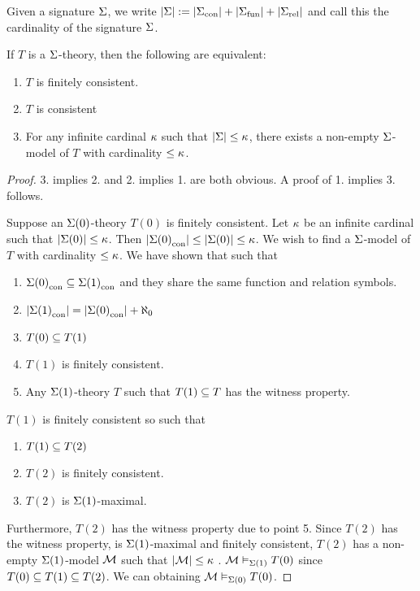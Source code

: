 \begin{nttn}
    Given a signature $\Sigma$, 
    we write
    $|\Sigma| := |{\Sigma}_\mathrm{con}| + |{\Sigma}_\mathrm{fun}| + |{\Sigma}_\mathrm{rel}|$
    and call this the cardinality of the signature $\Sigma$.
\end{nttn}

\begin{prop}
    If $T$ is a $\Sigma$-theory, 
    then the following are equivalent:
    \begin{enumerate}
        \item $T$ is finitely consistent.
        \item $T$ is consistent
        \item For any infinite cardinal $\kappa$ 
        such that $|\Sigma| \leq \kappa$, 
        there exists a non-empty $\Sigma$-model of 
        $T$ with cardinality $\leq \kappa$.
    \end{enumerate}
\end{prop}
\begin{proof}
    3. implies 2. and 2. implies 1. are both obvious. 
    A proof of 1. implies 3. follows.

    Suppose an
    $\Sigma(0)$-theory $T(0)$ is finitely consistent.
    Let $\kappa$ be an infinite cardinal such that 
    $|\Sigma(0)| \leq \kappa$. Then
    $|{\Sigma(0)}_\mathrm{con}| \leq |\Sigma(0)| \leq \kappa$.
    We wish to find a $\Sigma$-model of $T$ with cardinality $\leq \kappa$.
    We have shown that  such that 
    \begin{enumerate}
        \item ${\Sigma(0)}_\mathrm{con} \subseteq {\Sigma(1)}_\mathrm{con}$
        and they share the same function and relation symbols.
        \item $|{\Sigma(1)}_\mathrm{con}| = |{\Sigma(0)}_\mathrm{con}| + \aleph_0$
        \item $T(0) \subseteq T(1)$
        \item $T(1)$ is finitely consistent.
        \item Any $\Sigma(1)$-theory $T$ such that $T(1) \subseteq T$ 
        has the witness property.
    \end{enumerate}
    $T(1)$ is finitely consistent so
     such that 
    \begin{enumerate}[resume]
        \item $T(1) \subseteq T(2)$
        \item $T(2)$ is finitely consistent.
        \item $T(2)$ is $\Sigma(1)$-maximal.
    \end{enumerate}
    Furthermore, $T(2)$ has the witness property due to point 5.
    Since $T(2)$ has the witness property, is $\Sigma(1)$-maximal
    and finitely consistent,
    $T(2)$ has a non-empty $\Sigma(1)$-model $\mathcal{M}$ such that $|\mathcal{M}| \leq \kappa$
    .
    $\mathcal{M} \vDash_{\Sigma(1)} T(0)$ since $T(0) \subseteq T(1) \subseteq T(2)$.
    We can 
    obtaining $\mathcal{M} \vDash_{\Sigma(0)} T(0)$.
\end{proof}